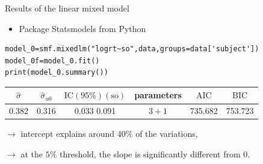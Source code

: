 \documentclass[unknownkeysallowed]{beamer}
\newcommand*{\AIC}{\mathrm{AIC}}
\newcommand*{\BIC}{\mathrm{BIC}}
\begin{document}
\begin{frame}[fragile]{Results of the linear mixed model}
\begin{itemize}
    \item Package Statsmodels from Python
\end{itemize}
\begin{lstlisting}
model_0=smf.mixedlm("logrt~so",data,groups=data['subject'])
model_0f=model_0.fit()
print(model_0.summary())
\end{lstlisting}

\begin{center}
    \begin{tabular}{|c|c|c|c|c|c|}
    \hline
         $\hat{\sigma}$ & $\hat{\sigma}_{u0}$ & $\text{IC}(95\%)(\text{so})$ & parameters & $\AIC$ & $\BIC$ \\
         \hline \hline
         0.382 & 0.316 & 0.033 0.091 & $3+1$ & 735.682 & 753.723 \\
         \hline
    \end{tabular}
\end{center}
$\longrightarrow$ intercept explains around $40\%$ of the variations,

$\longrightarrow$  at the $5\%$ threshold, the slope is significantly different from $0$.
\end{frame}
\end{document}
